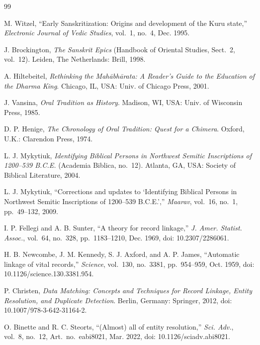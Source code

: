 \documentclass[journal]{IEEEtran}
\begin{document}
\begin{thebibliography}{99}

M. Witzel, ``Early Sanskritization: Origins and development of the Kuru state,''
\textit{Electronic Journal of Vedic Studies}, vol.~1, no.~4, Dec. 1995.

J. Brockington, \textit{The Sanskrit Epics} (Handbook of Oriental Studies, Sect.~2, vol.~12).
Leiden, The Netherlands: Brill, 1998.

A. Hiltebeitel, \textit{Rethinking the Mahābhārata: A Reader's Guide to the Education of the Dharma King}.
Chicago, IL, USA: Univ. of Chicago Press, 2001.

J. Vansina, \textit{Oral Tradition as History}. Madison, WI, USA: Univ. of Wisconsin Press, 1985.

D. P. Henige, \textit{The Chronology of Oral Tradition: Quest for a Chimera}. Oxford, U.K.: Clarendon Press, 1974.

L. J. Mykytiuk, \textit{Identifying Biblical Persons in Northwest Semitic Inscriptions of 1200--539 B.C.E.}
(Academia Biblica, no.~12). Atlanta, GA, USA: Society of Biblical Literature, 2004.

L. J. Mykytiuk, ``Corrections and updates to `Identifying Biblical Persons in Northwest Semitic Inscriptions of
1200--539 B.C.E.','' \textit{Maarav}, vol.~16, no.~1, pp.~49--132, 2009.

I. P. Fellegi and A. B. Sunter, ``A theory for record linkage,'' \textit{J. Amer. Statist. Assoc.}, vol.~64, no.~328,
pp.~1183--1210, Dec. 1969, doi: 10.2307/2286061.

H. B. Newcombe, J. M. Kennedy, S. J. Axford, and A. P. James, ``Automatic linkage of vital records,''
\textit{Science}, vol.~130, no.~3381, pp.~954--959, Oct. 1959, doi: 10.1126/science.130.3381.954.

P. Christen, \textit{Data Matching: Concepts and Techniques for Record Linkage, Entity Resolution, and Duplicate
Detection}. Berlin, Germany: Springer, 2012, doi: 10.1007/978-3-642-31164-2.

O. Binette and R. C. Steorts, ``(Almost) all of entity resolution,'' \textit{Sci. Adv.}, vol.~8, no.~12,
Art.~no.~eabi8021, Mar. 2022, doi: 10.1126/sciadv.abi8021.


\end{thebibliography}
\end{document}
